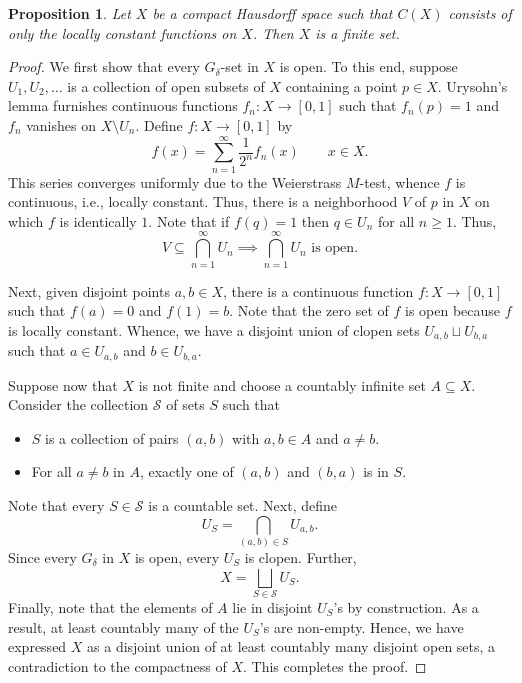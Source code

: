 \documentclass[12pt]{article}
\theoremstyle{thmstyle}
\newtheorem{proposition}[theorem]{Proposition}
\theoremstyle{defstyle}
\newcommand{\scrS}{\mathscr S}
\renewcommand{\ge}{\geqslant}
\begin{document}
\begin{proposition}
    Let $X$ be a compact Hausdorff space such that $C(X)$ consists of only the locally constant functions on $X$. Then $X$ is a finite set.
\end{proposition}
\begin{proof}
    We first show that every $G_\delta$-set in $X$ is open. To this end, suppose $U_1, U_2,\dots$ is a collection of open subsets of $X$ containing a point $p\in X$. Urysohn's lemma furnishes continuous functions $f_n: X\to[0, 1]$ such that $f_n(p) = 1$ and $f_n$ vanishes on $X\setminus U_n$. Define $f: X\to[0, 1]$ by 
    \begin{equation*}
        f(x) = \sum_{n = 1}^\infty\frac{1}{2^n}f_n(x)\qquad x\in X.
    \end{equation*}
    This series converges uniformly due to the Weierstrass $M$-test, whence $f$ is continuous, i.e., locally constant. Thus, there is a neighborhood $V$ of $p$ in $X$ on which $f$ is identically $1$. Note that if $f(q) = 1$ then $q\in U_n$ for all $n\ge 1$. Thus, 
    \begin{equation*}
        V\subseteq\bigcap_{n = 1}^\infty U_n\implies\bigcap_{n = 1}^\infty U_n\text{ is open}.
    \end{equation*}

    Next, given disjoint points $a,b\in X$, there is a continuous function $f:X\to [0,1]$ such that $f(a) = 0$ and $f(1) = b$. Note that the zero set of $f$ is open because $f$ is locally constant. Whence, we have a disjoint union of clopen sets $U_{a,b}\sqcup U_{b, a}$ such that $a\in U_{a,b}$ and $b\in U_{b, a}$.

    Suppose now that $X$ is not finite and choose a countably infinite set $A\subseteq X$. Consider the collection $\scrS$ of sets $S$ such that
    \begin{itemize}
        \item $S$ is a collection of pairs $(a, b)$ with $a, b\in A$ and $a\ne b$. 
        \item For all $a\ne b$ in $A$, exactly one of $(a, b)$ and $(b, a)$ is in $S$.
    \end{itemize}
    Note that every $S\in\mathscr S$ is a countable set. Next, define 
    \begin{equation*}
        U_S = \bigcap_{(a, b)\in S} U_{a, b}.
    \end{equation*}
    Since every $G_\delta$ in $X$ is open, every $U_S$ is clopen. Further, 
    \begin{equation*}
        X = \bigsqcup_{S\in\mathscr S} U_S.
    \end{equation*}
    Finally, note that the elements of $A$ lie in disjoint $U_S$'s by construction. As a result, at least countably many of the $U_S$'s are non-empty. Hence, we have expressed $X$ as a disjoint union of at least countably many disjoint open sets, a contradiction to the compactness of $X$. This completes the proof.
\end{proof}
\end{document}
